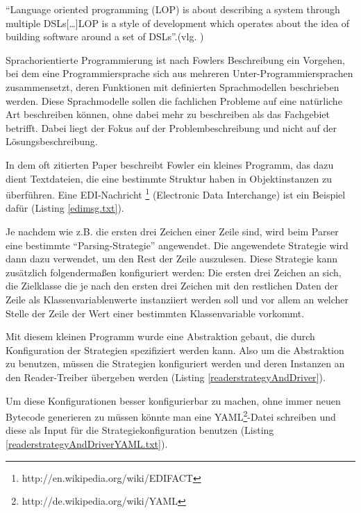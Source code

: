 \documentclass[11pt,english,ngerman, headsepline]{scrreprt}
\begin{document}
``Language oriented programming (LOP) is about describing a system through
multiple DSLs[\ldots]LOP is a style of development which operates about
the idea of building software around a set of DSLs''.(vlg.
\cite{fowler2005language})

Sprachorientierte Programmierung ist nach Fowlers Beschreibung ein Vorgehen,
bei dem eine Programmiersprache sich aus mehreren Unter-Programmiersprachen
zusammensetzt, deren Funktionen mit definierten Sprachmodellen beschrieben
werden.
Diese Sprachmodelle sollen die fachlichen Probleme auf eine
natürliche Art beschreiben können, ohne dabei mehr zu beschreiben als das
Fachgebiet betrifft. Dabei liegt der Fokus auf der Problembeschreibung und nicht
auf der Lösungsbeschreibung.

In dem oft zitierten Paper beschreibt Fowler ein kleines Programm, das dazu
dient Textdateien, die eine bestimmte Struktur haben in Objektinstanzen zu
überführen.
Eine EDI-Nachricht \footnote{http://en.wikipedia.org/wiki/EDIFACT} (Electronic
Data Interchange) ist ein Beispiel dafür (Listing \ref{edimsg.txt}).



Je nachdem wie z.B. die ersten drei Zeichen einer Zeile sind, wird beim
Parser eine bestimmte ``Parsing-Strategie'' angewendet. 
Die angewendete Strategie\cite{gamma1995design} wird dann dazu verwendet, um den
Rest der Zeile auszulesen. Diese Strategie kann zusätzlich folgendermaßen
konfiguriert werden:
Die ersten drei Zeichen an sich, die Zielklasse die je nach den ersten drei Zeichen mit den restlichen Daten der
Zeile als Klassenvariablenwerte instanziiert werden soll und vor allem an
welcher Stelle der Zeile der Wert einer bestimmten Klassenvariable vorkommt.

Mit diesem kleinen Programm wurde eine Abstraktion gebaut, die durch
Konfiguration der Strategien spezifiziert werden kann.
Also um die Abstraktion zu benutzen, müssen die Strategien konfiguriert werden
und deren Instanzen an den Reader-Treiber übergeben werden  (Listing
\ref{readerstrategyAndDriver}).
 



Um diese Konfigurationen besser konfigurierbar zu machen, ohne immer neuen
Bytecode generieren zu müssen könnte man eine
YAML\footnote{http://de.wikipedia.org/wiki/YAML}-Datei schreiben und diese als
Input für die Strategiekonfiguration benutzen  (Listing
\ref{readerstrategyAndDriverYAML.txt}).
 
\end{document}

